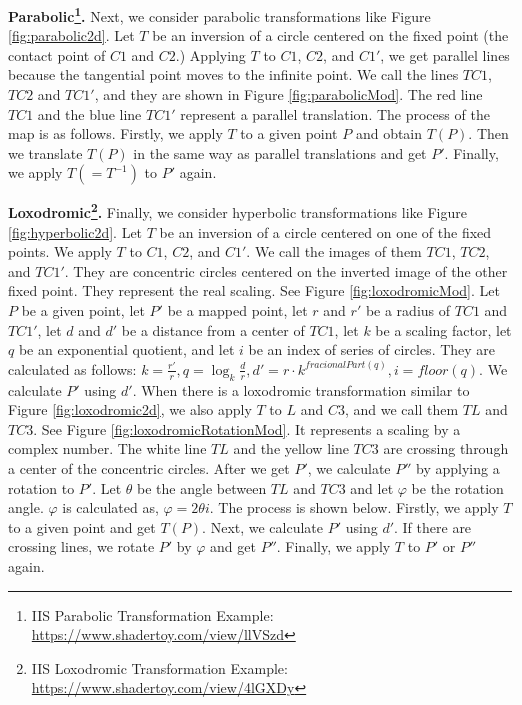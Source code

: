  \noindent\textbf{Parabolic\footnote{IIS Parabolic Transformation Example: \url{https://www.shadertoy.com/view/llVSzd}}.}
 Next, we consider parabolic transformations like Figure \ref{fig:parabolic2d}.
 Let $T$ be an inversion of a circle centered on the fixed point (the contact point of $C1$ and $C2$.)
 Applying $T$ to $C1$, $C2$, and $C1'$, we get parallel lines because
 the tangential point moves to the infinite point.
 We call the lines $TC1$, $TC2$ and $ TC1'$, and they are shown in
 Figure \ref{fig:parabolicMod}.
 The red line $TC1$ and the blue line $TC1'$ represent a parallel translation.
 The process of the map is as follows.
 Firstly, we apply $T$ to a given point $P$ and obtain $T(P)$.
 Then we translate $T(P)$ in the same way as parallel translations and get $P'$.
 Finally, we apply $T(= T^{-1}) $ to $P'$ again.

 \noindent\textbf{Loxodromic\footnote{IIS Loxodromic Transformation Example: \url{https://www.shadertoy.com/view/4lGXDy}}.}
 Finally, we consider hyperbolic
 transformations like Figure \ref{fig:hyperbolic2d}.
 Let $T$ be an inversion of a circle centered on one of the fixed
 points.
 We apply $T$ to $C1$, $C2$, and $C1'$.
 We call the images of them $TC1$, $TC2$, and $TC1'$.
 They are concentric circles centered on the inverted image
 of the other fixed point.
 They represent the real scaling.
 See Figure \ref{fig:loxodromicMod}.
 Let $P$ be a given point,
 let $P'$ be a mapped point,
 let $r$ and $r'$ be a radius of $TC1$ and $TC1'$,
 let $d$ and $d'$ be a distance from a center of $TC1$,
 let $k$ be a scaling factor,
 let $q$ be an exponential quotient, and let $i$ be an index of
 series of circles. They are calculated as follows:
 \begin{math}
  k = \frac{r'}{r},
  q = \log_{k} \frac{d}{r},
  d' = r \cdot k^{fracionalPart(q)},
  i = floor(q).
 \end{math}
 We calculate $P'$ using $d'$.
 When there is a loxodromic transformation similar to Figure \ref{fig:loxodromic2d},
 we also apply $T$ to $L$ and $C3$, and we call them $TL$ and $TC3$.
 See Figure \ref{fig:loxodromicRotationMod}.
 It represents a scaling by a complex number.
 The white line $TL$ and the yellow line $TC3$ are crossing
 through a center of the concentric circles.
 After we get $P'$, we calculate $P''$ by applying a rotation to $P'$.
 Let $\theta$ be the angle between $TL$ and $TC3$ and
 let $\varphi$ be the rotation angle.
 $\varphi$ is calculated as, $\varphi = 2 \theta i$.
 The process is shown below.
 Firstly, we apply $T$ to a given point and get $T(P)$.
 Next, we calculate $P'$ using $d'$.
 If there are crossing lines, we rotate $P'$ by $\varphi$ and get $P''$.
 Finally, we apply $T$ to $P'$ or $P''$ again.


